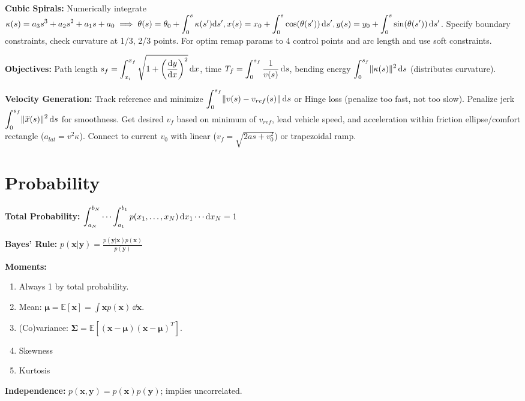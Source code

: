 \documentclass[twocolumn, 8pt]{extarticle}
\begin{document}
\textbf{Cubic Spirals:} Numerically integrate \(\displaystyle \kappa(s) = a_3s^3 + a_2s^2 + a_1s + a_0 \implies
\theta(s) = \theta _0 + \int _0^s \kappa(s')\mathrm{d}s', x(s) = x_0 + \int _0^s \cos(\theta(s'))\,\mathrm{d}s', y(s) = y_0 + \int _0^s
\sin(\theta(s'))\,\mathrm{d}s'\). Specify boundary constraints, check curvature at 1/3, 2/3 points. For optim remap params to 4
control points and arc length and use soft constraints.

\textbf{Objectives:} Path length \(\displaystyle s_f = \int _{x_i}^{x_f} \sqrt{1 + \left(\frac{\mathrm{d}y}{\mathrm{d}x}\right)^2}\,\mathrm{d}x\),
time \(\displaystyle T_f = \int _0^{s_f} \frac{1}{v(s)}\,\mathrm{d}s\), bending energy \(\displaystyle \int _0^{s_f}
\lVert\kappa(s)\rVert^2\,\mathrm{d}s\) (distributes curvature).

\textbf{Velocity Generation:} Track reference and minimize \(\displaystyle \int _0^{s_f} \lVert v(s) - v_{ref}(s)\rVert\,\mathrm{d}s\)
or Hinge loss (penalize too fast, not too slow). Penalize jerk \(\displaystyle \int _0^{s_f} \lVert\dddot x(s)\rVert^2\,\mathrm{d}s\)
for smoothness. Get desired \(v_f\) based on minimum of \(v_{ref}\), lead vehicle speed, and acceleration within
friction ellipse/comfort rectangle (\(a_{lat} = v^2\kappa\)). Connect to current \(v_0\) with linear (\(v_f = \sqrt{2as
+ v_0^2}\)) or trapezoidal ramp.

\section{Probability} %

\textbf{Total Probability:} \(\displaystyle \int _{a_N}^{b_N} \cdots \int _{a_1}^{b_1} p(x_1, \dots, x_N) \,\mathrm{d}x_1\cdots\mathrm{d}x_N = 1\)

\textbf{Bayes' Rule:} \(\displaystyle p(\bm x | \bm y) = \frac{p(\bm y | \bm x)p(\bm x)}{p(\bm y)}\)

\textbf{Moments:}
\begin{enumerate}[start=0]
  \item Always 1 by total probability.
  \item Mean: \(\displaystyle \bm\mu = \mathbb E[\bm x] = \int \bm x p(\bm x)\,\dd\bm x\).
  \item (Co)variance: \(\bm\Sigma = \mathbb E[(\bm x - \bm\mu)(\bm x - \bm\mu)^T]\).
  \item Skewness
  \item Kurtosis
\end{enumerate}

\textbf{Independence:} \(p(\bm x, \bm y) = p(\bm x)p(\bm y)\); implies uncorrelated.
\end{document}
